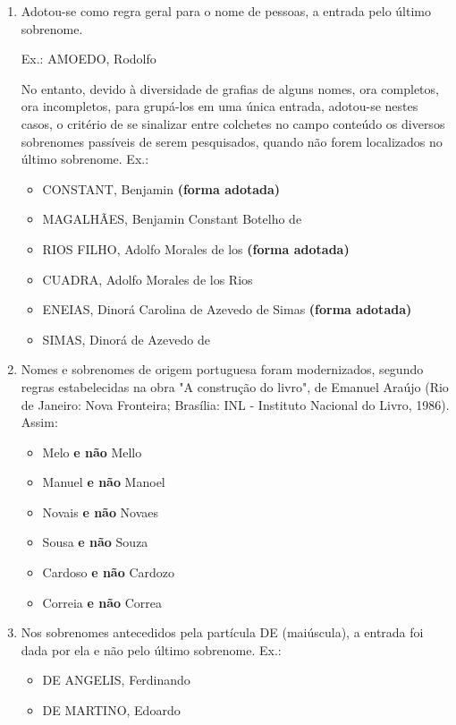 \begin{enumerate}[label=(\alph*)]
	\item Adotou-se como regra geral para o nome de pessoas, a entrada pelo último sobrenome.
	
	Ex.: AMOEDO, Rodolfo
	
	No entanto, devido à diversidade de grafias de alguns nomes, ora completos, ora incompletos, para grupá-los em uma única entrada, adotou-se nestes casos, o critério de se sinalizar entre colchetes no campo conteúdo os diversos sobrenomes passíveis de serem pesquisados, quando não forem localizados no último sobrenome. Ex.:
	\begin{itemize}
		\item CONSTANT, Benjamin \textbf{(forma adotada)}
		\item MAGALHÃES, Benjamin Constant Botelho de
		\item RIOS FILHO, Adolfo Morales de los \textbf{(forma adotada)}
		\item CUADRA, Adolfo Morales de los Rios
		\item ENEIAS, Dinorá Carolina de Azevedo de Simas \textbf{(forma adotada)}
		\item SIMAS, Dinorá de Azevedo de
	\end{itemize}
	
	\item Nomes e sobrenomes de origem portuguesa foram modernizados, segundo regras estabelecidas na obra "A construção do livro", de Emanuel Araújo (Rio de Janeiro: Nova Fronteira; Brasília: INL - Instituto Nacional do Livro, 1986). Assim:
	\begin{itemize}
		\item Melo \textbf{e não} Mello
		\item Manuel \textbf{e não} Manoel
		\item Novais \textbf{e não} Novaes
		\item Sousa \textbf{e não} Souza
		\item Cardoso \textbf{e não} Cardozo
		\item Correia \textbf{e não} Correa
	\end{itemize}
	
	\item Nos sobrenomes antecedidos pela partícula DE (maiúscula), a entrada foi dada por ela e não pelo último sobrenome. Ex.:
	\begin{itemize}
		\item DE ANGELIS, Ferdinando
		\item DE MARTINO, Edoardo
	\end{itemize}


\end{enumerate}
